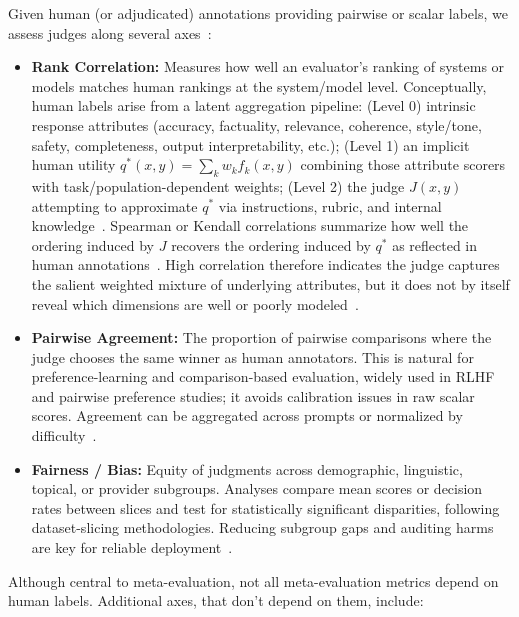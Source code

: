 Given human (or adjudicated) annotations providing pairwise or scalar labels, we assess judges along several axes~\cite{li2024_llmsasjudges, bavaresco2024judgebench, hada2024metal, liang2022helm}:
\begin{itemize}
\item \textbf{Rank Correlation:} Measures how well an evaluator’s ranking of systems or models matches human rankings at the system/model level. Conceptually, human labels arise from a latent aggregation pipeline: (Level 0) intrinsic response attributes (accuracy, factuality, relevance, coherence, style/tone, safety, completeness, output interpretability, etc.); (Level 1) an implicit human utility $q^*(x,y) = \sum_k w_k f_k(x,y)$ combining those attribute scorers with task/population-dependent weights; (Level 2) the judge $J(x,y)$ attempting to approximate $q^*$ via instructions, rubric, and internal knowledge~\cite{li2024_llmsasjudges, liang2022helm}. Spearman or Kendall correlations summarize how well the ordering induced by $J$ recovers the ordering induced by $q^*$ as reflected in human annotations~\cite{bavaresco2024judgebench, zheng2023judgelm}. High correlation therefore indicates the judge captures the salient weighted mixture of underlying attributes, but it does not by itself reveal which dimensions are well or poorly modeled~\cite{stiennon2020learning, ouyang2022training}.
\item \textbf{Pairwise Agreement:} The proportion of pairwise comparisons where the judge chooses the same winner as human annotators. This is natural for preference-learning and comparison-based evaluation, widely used in RLHF and pairwise preference studies; it avoids calibration issues in raw scalar scores. Agreement can be aggregated across prompts or normalized by difficulty~\cite{liu2024pairs, bavaresco2024judgebench}.
\item \textbf{Fairness / Bias:} Equity of judgments across demographic, linguistic, topical, or provider subgroups. Analyses compare mean scores or decision rates between slices and test for statistically significant disparities, following dataset-slicing methodologies. Reducing subgroup gaps and auditing harms are key for reliable deployment~\cite{liang2022helm, hada2024metal}.
\end{itemize}
Although central to meta-evaluation, not all meta-evaluation metrics depend on human labels. Additional axes, that don't depend on them, include:

